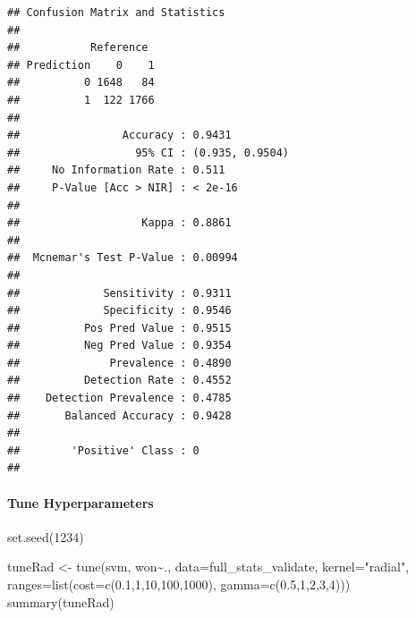 \documentclass[
]{article}
\newenvironment{Shaded}{\begin{snugshade}}{\end{snugshade}}
\newcommand{\AttributeTok}[1]{\textcolor[rgb]{0.77,0.63,0.00}{#1}}
\newcommand{\DecValTok}[1]{\textcolor[rgb]{0.00,0.00,0.81}{#1}}
\newcommand{\FloatTok}[1]{\textcolor[rgb]{0.00,0.00,0.81}{#1}}
\newcommand{\FunctionTok}[1]{\textcolor[rgb]{0.00,0.00,0.00}{#1}}
\newcommand{\NormalTok}[1]{#1}
\newcommand{\OtherTok}[1]{\textcolor[rgb]{0.56,0.35,0.01}{#1}}
\newcommand{\SpecialCharTok}[1]{\textcolor[rgb]{0.00,0.00,0.00}{#1}}
\newcommand{\StringTok}[1]{\textcolor[rgb]{0.31,0.60,0.02}{#1}}
\begin{document}
\begin{verbatim}
## Confusion Matrix and Statistics
## 
##           Reference
## Prediction    0    1
##          0 1648   84
##          1  122 1766
##                                          
##                Accuracy : 0.9431         
##                  95% CI : (0.935, 0.9504)
##     No Information Rate : 0.511          
##     P-Value [Acc > NIR] : < 2e-16        
##                                          
##                   Kappa : 0.8861         
##                                          
##  Mcnemar's Test P-Value : 0.00994        
##                                          
##             Sensitivity : 0.9311         
##             Specificity : 0.9546         
##          Pos Pred Value : 0.9515         
##          Neg Pred Value : 0.9354         
##              Prevalence : 0.4890         
##          Detection Rate : 0.4552         
##    Detection Prevalence : 0.4785         
##       Balanced Accuracy : 0.9428         
##                                          
##        'Positive' Class : 0              
## 
\end{verbatim}

\hypertarget{tune-hyperparameters}{%
\paragraph{Tune Hyperparameters}\label{tune-hyperparameters}}

\begin{Shaded}
\begin{Highlighting}[]
\FunctionTok{set.seed}\NormalTok{(}\DecValTok{1234}\NormalTok{)}

\NormalTok{tuneRad }\OtherTok{\textless{}{-}} \FunctionTok{tune}\NormalTok{(svm, won}\SpecialCharTok{\textasciitilde{}}\NormalTok{., }\AttributeTok{data=}\NormalTok{full\_stats\_validate, }\AttributeTok{kernel=}\StringTok{"radial"}\NormalTok{, }\AttributeTok{ranges=}\FunctionTok{list}\NormalTok{(}\AttributeTok{cost=}\FunctionTok{c}\NormalTok{(}\FloatTok{0.1}\NormalTok{,}\DecValTok{1}\NormalTok{,}\DecValTok{10}\NormalTok{,}\DecValTok{100}\NormalTok{,}\DecValTok{1000}\NormalTok{), }\AttributeTok{gamma=}\FunctionTok{c}\NormalTok{(}\FloatTok{0.5}\NormalTok{,}\DecValTok{1}\NormalTok{,}\DecValTok{2}\NormalTok{,}\DecValTok{3}\NormalTok{,}\DecValTok{4}\NormalTok{)))}
\FunctionTok{summary}\NormalTok{(tuneRad)}
\end{Highlighting}
\end{Shaded}
\end{document}
